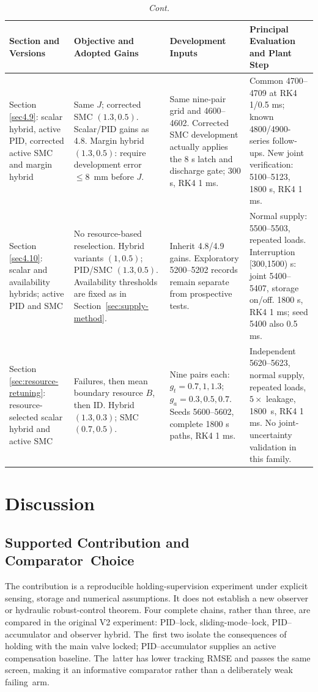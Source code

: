 \documentclass[machines,article,submit,pdftex,moreauthors]{Definitions/mdpi}
\begin{document}
\begin{table}[H]\ContinuedFloat

\caption{\textit{Cont.}}



\footnotesize
\begin{tabularx}{\textwidth}{LLLL}
\toprule
\textbf{Section and Versions} & \textbf{Objective and Adopted Gains} & \textbf{Development Inputs} & \textbf{Principal Evaluation and Plant Step}\\\midrule




Section \ref{sec4.9}: scalar hybrid, active PID, corrected active SMC and margin hybrid & Same $J$; corrected SMC $(1.3,0.5)$. Scalar/PID gains as 4.8. Margin hybrid $(1.3,0.5)$: require development \mbox{error $\le8$ mm} before $J$. & Same nine-pair grid and 4600--4602. Corrected SMC development actually applies the 8 s latch and discharge gate; 300 s, RK4 1 ms. & Common 4700--4709 at RK4 1/0.5 ms; known 4800/4900-series follow-ups. New joint verification: 5100--5123, 1800 s, RK4 1 ms.\\
\midrule
Section \ref{sec4.10}: scalar and availability hybrids; active PID and SMC & No resource-based reselection. Hybrid variants $(1,0.5)$; PID/SMC $(1.3,0.5)$. Availability thresholds are fixed as in Section~\ref{sec:supply-method}. & Inherit 4.8/4.9 gains. Exploratory 5200--5202 records remain separate from prospective tests. & Normal supply: 5500--5503, repeated loads. Interruption [300,1500) s: joint 5400--5407, storage on/off. 1800 s, RK4 1 ms; seed 5400 also 0.5 ms.\\
\midrule
Section \ref{sec:resource-retuning}: resource-selected scalar hybrid and active SMC & Failures, then mean boundary resource $B$, then ID. Hybrid $(1.3,0.3)$; SMC $(0.7,0.5)$. & Nine pairs each: $g_t=0.7,1,1.3$; $g_a=0.3,0.5,0.7$. Seeds 5600--5602, complete 1800 s paths, RK4 1 ms. & Independent 5620--5623, normal supply, repeated loads, $5\times$ leakage, \mbox{1800 s}, RK4 1 ms. No joint-uncertainty validation in this family.\\\bottomrule
\end{tabularx}
\end{table}
\unskip


\section{Discussion}
\unskip
\subsection{Supported Contribution and Comparator~Choice}
The contribution is a reproducible holding-supervision experiment under explicit sensing, storage and numerical assumptions. It does not establish a new observer or hydraulic robust-control theorem. Four complete chains, rather than three, are compared in the original V2 experiment: PID--lock, sliding-mode--lock, PID--accumulator and observer hybrid. The~first two isolate the consequences of holding with the main valve locked; PID--accumulator supplies an active compensation baseline. The~latter has lower tracking RMSE and passes the same screen, making it an informative comparator rather than a deliberately weak failing~arm.
\end{document}
